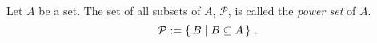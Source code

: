 \guard




\begin{defn}
\label{defn:powerSet}
  Let $A$ be a set.
  The set of all subsets of $A$, $\mathcal{P}$, is called the \emph{power set} of $A$.
  \[ \mathcal{P} := \left\{\, B\mid B\subseteq A\,\right\}\,.\]
\end{defn}
